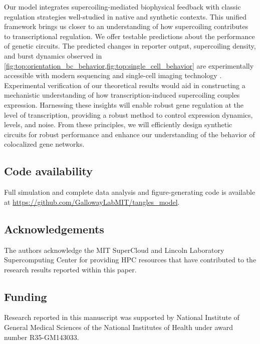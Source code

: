 \documentclass[11pt]{article}
\begin{document}
Our model integrates supercoiling-mediated biophysical feedback with classic regulation strategies well-studied in native and synthetic contexts. This unified framework brings us closer to an understanding of how supercoiling contributes to transcriptional regulation. We offer testable predictions about the performance of genetic circuits. The predicted changes in reporter output, supercoiling density, and burst dynamics observed in \cref{fig:top:orientation_bc_behavior,fig:top:single_cell_behavior} are experimentally accessible with modern sequencing and single-cell imaging technology \parencite{guoHighresolutionGenomewideMapping2021,mellorInterleavedGenome2016,patelDNASupercoilingRestricts2022}. Experimental verification of our theoretical results would aid in constructing a mechanistic understanding of how transcription-induced supercoiling couples expression. Harnessing these insights will enable robust gene regulation at the level of transcription, providing a robust method to control expression dynamics, levels, and noise. From these principles, we will efficiently design synthetic circuits for robust performance and enhance our understanding of the behavior of colocalized gene networks.

\subsection{Code availability}
Full simulation and complete data analysis and figure-generating code is available at \url{https://github.com/GallowayLabMIT/tangles_model}.

\subsection{Acknowledgements}
The authors acknowledge the MIT SuperCloud and Lincoln Laboratory Supercomputing Center \parencite{reutherInteractiveSupercomputing402018} for providing HPC resources that have contributed to the research results reported within this paper.

\subsection{Funding}
Research reported in this manuscript was supported by National Institute of General Medical Sciences of the National Institutes of Health under award number R35-GM143033.

\printbibliography

\clearpage
\appendix
\titleformat{\subsection}[hang]{\bfseries}{\thesubsection}{0em}{\;\;}
\renewcommand{\appendixpagename}{Supplemental information}
\renewcommand{\thefigure}{S\arabic{figure}}
\renewcommand{\theequation}{S\arabic{equation}}
\setcounter{equation}{0}
\setcounter{figure}{0}
\appendixpage
\end{document}
